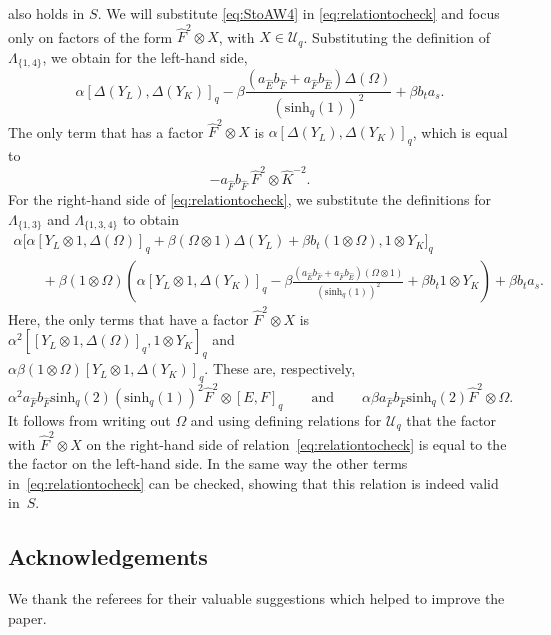 \documentclass[pdftex]{sigma}
\numberwithin{equation}{section}
\newcommand{\shq}{\mathrm{sinh}_q}
\newcommand{\Uq}{\mathcal{U}_q}
\begin{document}
also holds in $S$. We will substitute \eqref{eq:StoAW4} in \eqref{eq:relationtocheck} and focus only on factors of the form $\hat{F}^2\otimes X$, with $X\in \Uq$. Substituting the definition of $\Lambda_{\{1,4\}}$, we obtain for the left-hand side,
\[
\alpha[\Delta(Y_L),\Delta(Y_K)]_q - \beta \frac{(a_{\hat{E}}b_{\hat{F}}+a_{\hat{F}}b_{\hat{E}})\Delta(\Omega)}{(\shq(1))^2} +\beta b_ta_s.
\]
The only term that has a factor $\hat{F}^2\otimes X$ is $\alpha[\Delta(Y_L),\Delta(Y_K)]_q$, which is equal to
\[
-a_{\hat{F}}b_{\hat{F}}\ 	\hat{F}^2\otimes \hat{K}^{-2}.
\]
For the right-hand side of \eqref{eq:relationtocheck}, we substitute the definitions for $\Lambda_{\{1,3\}}$ and $\Lambda_{\{1,3,4\}}$ to obtain
\begin{gather*}
	\alpha \big[\alpha[Y_L\otimes 1,\Delta(\Omega)]_q + \beta (\Omega\otimes 1)\Delta(Y_L)+\beta b_t(1\otimes \Omega),1\otimes Y_K \big]_q \\
	\qquad+\beta (1\otimes\Omega)\left(\alpha[Y_L\otimes 1,\Delta(Y_K)]_q - \beta \frac{(a_{\hat E}b_{\hat F}+ a_{\hat F}b_{\hat E})(\Omega\otimes1)}{(\shq(1))^2}+\beta b_t1\otimes Y_K\right)+ \beta b_ta_s.
\end{gather*}
Here, the only terms that have a factor $\hat{F}^2\otimes X$ is $\alpha^2 [[Y_L\otimes 1,\Delta(\Omega)]_q,1\otimes Y_K]_q$ and\\ $\alpha \beta (1\otimes\Omega)[Y_L\otimes 1,\Delta(Y_K)]_q$. These are, respectively,
\[
\alpha^2 a_{\hat{F}}b_{\hat{F}} \shq(2) (\shq(1))^2 \hat{F}^2\otimes [E,F]_q \qquad \text{and} \qquad \alpha \beta a_{\hat{F}}b_{\hat{F}} \shq(2) \hat{F}^2\otimes \Omega.
\]
It follows from writing out $\Omega$ and using defining relations for $\Uq$ that the factor with $\hat F^2 \otimes X$ on the right-hand side of relation~\eqref{eq:relationtocheck} is equal to the the factor on the left-hand side. In the same way the other terms in~\eqref{eq:relationtocheck} can be checked, showing that this relation is indeed valid in~$S$.

\subsection*{Acknowledgements}
We thank the referees for their valuable suggestions which helped to improve the paper.
\end{document}
